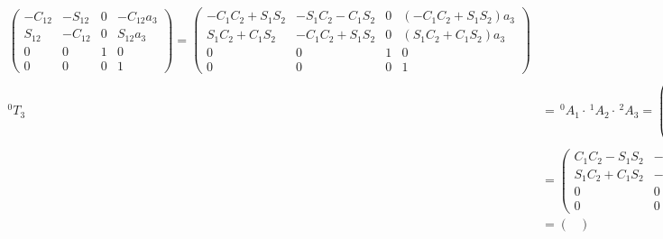 \begin{align*}
\begin{pmatrix}
-C_{12} & -S_{12} & 0 & -C_{12}a_3 \\
S_{12} & -C_{12} & 0 & S_{12}a_3 \\
0 & 0 & 1 & 0 \\
0 & 0 & 0 & 1 
\end{pmatrix}
=
\begin{pmatrix}
-C_1C_2+S_1S_2 & -S_1C_2-C_1S_2 & 0 & (-C_1C_2+S_1S_2)a_3 \\
S_1C_2+C_1S_2 & -C_1C_2+S_1S_2 & 0 & (S_1C_2+C_1S_2)a_3 \\
0 & 0 & 1 & 0 \\
0 & 0 & 0 & 1 
\end{pmatrix} \\
^0T_3 &= \,^0A_1\cdot\,^1A_2\cdot\,^2A_3 =
\begin{pmatrix}
C_1 & -S_1 & 0 & C_1a_1 \\
S_1 & C_1 & 0 & S_1a_1 \\
0 & 0 & 1 & 0 \\
0 & 0 & 0 & 1 
\end{pmatrix}\cdot
\begin{pmatrix}
C_2 & -S_2 & 0 & C_2a_2 \\
S_2 & C_2 & 0 & S_2a_2 \\
0 & 0 & 1 & 0 \\
0 & 0 & 0 & 1 
\end{pmatrix}\cdot
\begin{pmatrix}
-C_{12} & -S_{12} & 0 & -C_{12}a_3 \\
S_{12} & -C_{12} & 0 & S_{12}a_3 \\
0 & 0 & 1 & 0 \\
0 & 0 & 0 & 1 
\end{pmatrix}\\
&= 
\begin{pmatrix}
C_1C_2-S_1S_2 & -C_1S_2-S_1C_2 & 0 & C_1C_2a_2-S_1S_2a_2+C_1a_1 \\
S_1C_2+C_1S_2 & -S_1S_2+C_1C_2 & 0 & S_1C_2a_2+C_1S_2a_2+S_1a_1 \\
0 & 0 & 1 & 0 \\
0 & 0 & 0 & 1 
\end{pmatrix}\cdot
\begin{pmatrix}
-C_{12} & -S_{12} & 0 & -C_{12}a_3 \\
S_{12} & -C_{12} & 0 & S_{12}a_3 \\
0 & 0 & 1 & 0 \\
0 & 0 & 0 & 1 
\end{pmatrix}\\
&= 
\begin{pmatrix}

\end{pmatrix}
\end{align*}
